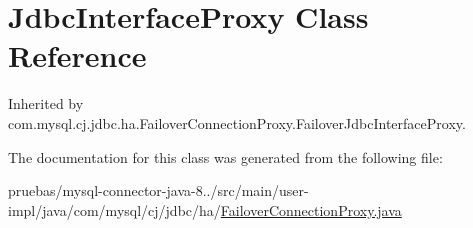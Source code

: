\hypertarget{class_jdbc_interface_proxy}{}\section{Jdbc\+Interface\+Proxy Class Reference}
\label{class_jdbc_interface_proxy}


Inherited by com.\+mysql.\+cj.\+jdbc.\+ha.\+Failover\+Connection\+Proxy.\+Failover\+Jdbc\+Interface\+Proxy.



The documentation for this class was generated from the following file\+:\begin{DoxyCompactItemize}
\item 
pruebas/mysql-\/connector-\/java-\/8../src/main/user-\/impl/java/com/mysql/cj/jdbc/ha/\mbox{\hyperlink{_failover_connection_proxy_8java}{Failover\+Connection\+Proxy.\+java}}\end{DoxyCompactItemize}
